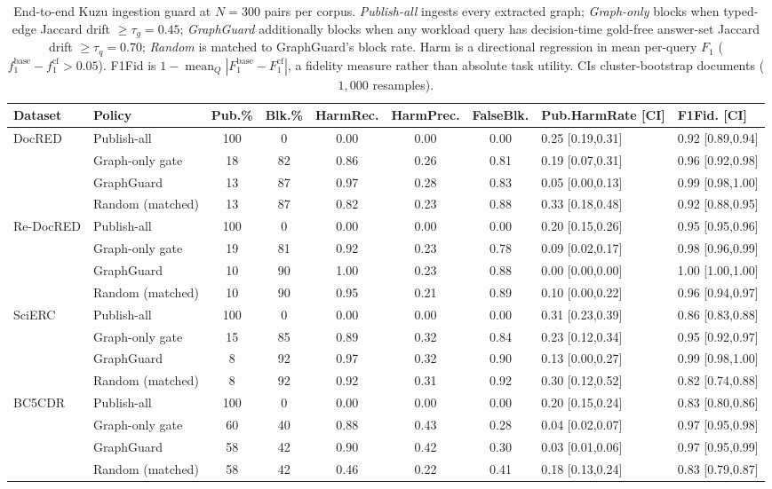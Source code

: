 \begin{table}[t]
\centering\small
\caption{End-to-end Kuzu ingestion guard at $N{=}300$ pairs per corpus. \emph{Publish-all} ingests every extracted graph; \emph{Graph-only} blocks when typed-edge Jaccard drift $\geq\tau_g{=}0.45$; \emph{GraphGuard} additionally blocks when any workload query has decision-time gold-free answer-set Jaccard drift $\geq\tau_q{=}0.70$; \emph{Random} is matched to GraphGuard's block rate. Harm is a directional regression in mean per-query $F_1$ ($f_1^{\mathrm{base}}{-}f_1^{\mathrm{cf}}>0.05$). F1Fid is $1-\operatorname{mean}_Q|F_1^{\mathrm{base}}-F_1^{\mathrm{cf}}|$, a fidelity measure rather than absolute task utility. CIs cluster-bootstrap documents ($1{,}000$ resamples).}
\label{tab:e2ekuzu}
\begin{tabular}{llcccccll}
\toprule
Dataset & Policy & Pub.\% & Blk.\% & HarmRec. & HarmPrec. & FalseBlk. & Pub.HarmRate [CI] & F1Fid. [CI] \\
\midrule
DocRED & Publish-all & 100 & 0 & 0.00 & 0.00 & 0.00 & 0.25 [0.19,0.31] & 0.92 [0.89,0.94] \\
 & Graph-only gate & 18 & 82 & 0.86 & 0.26 & 0.81 & 0.19 [0.07,0.31] & 0.96 [0.92,0.98] \\
 & GraphGuard & 13 & 87 & 0.97 & 0.28 & 0.83 & 0.05 [0.00,0.13] & 0.99 [0.98,1.00] \\
 & Random (matched) & 13 & 87 & 0.82 & 0.23 & 0.88 & 0.33 [0.18,0.48] & 0.92 [0.88,0.95] \\
\midrule
Re-DocRED & Publish-all & 100 & 0 & 0.00 & 0.00 & 0.00 & 0.20 [0.15,0.26] & 0.95 [0.95,0.96] \\
 & Graph-only gate & 19 & 81 & 0.92 & 0.23 & 0.78 & 0.09 [0.02,0.17] & 0.98 [0.96,0.99] \\
 & GraphGuard & 10 & 90 & 1.00 & 0.23 & 0.88 & 0.00 [0.00,0.00] & 1.00 [1.00,1.00] \\
 & Random (matched) & 10 & 90 & 0.95 & 0.21 & 0.89 & 0.10 [0.00,0.22] & 0.96 [0.94,0.97] \\
\midrule
SciERC & Publish-all & 100 & 0 & 0.00 & 0.00 & 0.00 & 0.31 [0.23,0.39] & 0.86 [0.83,0.88] \\
 & Graph-only gate & 15 & 85 & 0.89 & 0.32 & 0.84 & 0.23 [0.12,0.34] & 0.95 [0.92,0.97] \\
 & GraphGuard & 8 & 92 & 0.97 & 0.32 & 0.90 & 0.13 [0.00,0.27] & 0.99 [0.98,1.00] \\
 & Random (matched) & 8 & 92 & 0.92 & 0.31 & 0.92 & 0.30 [0.12,0.52] & 0.82 [0.74,0.88] \\
\midrule
BC5CDR & Publish-all & 100 & 0 & 0.00 & 0.00 & 0.00 & 0.20 [0.15,0.24] & 0.83 [0.80,0.86] \\
 & Graph-only gate & 60 & 40 & 0.88 & 0.43 & 0.28 & 0.04 [0.02,0.07] & 0.97 [0.95,0.98] \\
 & GraphGuard & 58 & 42 & 0.90 & 0.42 & 0.30 & 0.03 [0.01,0.06] & 0.97 [0.95,0.99] \\
 & Random (matched) & 58 & 42 & 0.46 & 0.22 & 0.41 & 0.18 [0.13,0.24] & 0.83 [0.79,0.87] \\
\bottomrule
\end{tabular}
\end{table}
